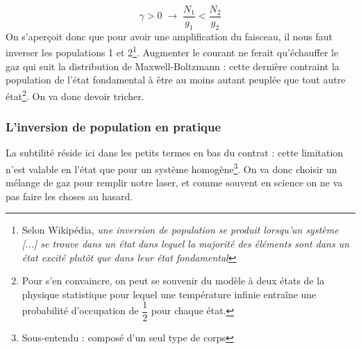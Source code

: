 \begin{equation*}
\boxed{
    \gamma > 0 \; \longrightarrow \; \dfrac{N_1}{g_1} < \dfrac{N_2}{g_2}
    }
\end{equation*}
On s'aperçoit donc que pour avoir une amplification du faisceau, il nous faut inverser les populations 1 et 2\footnote{Selon Wikipédia, \textit{une inversion de population se produit lorsqu'un système [...] se trouve dans un état dans lequel la majorité des éléments sont dans un état excité plutôt que dans leur état fondamental}}. Augmenter le courant ne ferait qu'échauffer le gaz qui suit la distribution de Maxwell-Boltzmann : cette dernière contraint la population de l'état fondamental à être au moins autant peuplée que tout autre état\footnote{Pour s'en convaincre, on peut se souvenir du modèle à deux états de la physique statistique pour lequel une température infinie entraîne une probabilité d'occupation de $\dfrac{1}{2}$ pour chaque état.}. On va donc devoir tricher.


\subsubsection{L'inversion de population en pratique}


La subtilité réside ici dans les petits termes en bas du contrat : cette limitation n'est valable en l'état que pour un système homogène\footnote{Sous-entendu : composé d'un seul type de corps}. On va donc choisir un mélange de gaz pour remplir notre laser, et comme souvent en science on ne va pas faire les choses au hasard.\\

